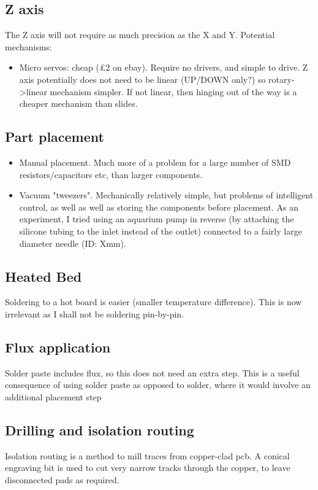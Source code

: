 \documentclass[a4paper,11pt]{article}  %
\begin{document}
\subsection{Z axis}
The Z axis will not require as much precision as the X and Y. Potential mechanisms:

\begin{itemize}
	\item	Micro servos: cheap (£2 on ebay). Require no drivers, and simple to drive. Z axis potentially
		does not need to be linear (UP/DOWN only?) so rotary-\textgreater linear mechanism simpler. If not linear,
		then hinging out of the way is a cheaper mechanism than slides.
\end{itemize}

\subsection{Part placement}

\begin{itemize}
	\item	Manual placement. Much more of a problem for a large number of SMD resistors/capacitors etc, than
		larger components. 
	\item	Vacuum "tweezers". Mechanically relatively simple, but problems of intelligent control, as well
		as well as storing the components before placement. As an experiment, I tried using an aquarium pump
		in reverse (by attaching the silicone tubing to the inlet instead of the outlet) connected to a fairly
		large diameter needle (ID: Xmm).
\end{itemize}

\subsection{Heated Bed}
Soldering to a hot board is easier (smaller temperature difference). This is now irrelevant as I shall not be soldering pin-by-pin.

\subsection{Flux application}
Solder paste includes flux, so this does not need an extra step. This is a useful consequence of using solder paste as opposed to solder,
where it would involve an additional placement step

\subsection{Drilling and isolation routing}
Isolation routing is a method to mill traces from copper-clad pcb. A conical engraving bit is used to cut very narrow tracks through
the copper, to leave disconnected pads as required. 
\end{document}

